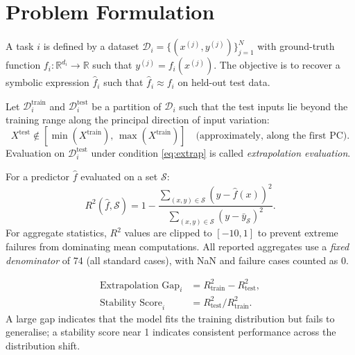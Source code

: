 \documentclass[twoside,11pt]{article}
\newcommand{\Rsq}{R^{2}}
\newcommand{\Rtrain}{R^{2}_{\mathrm{train}}}
\newcommand{\Rtest}{R^{2}_{\mathrm{test}}}
\begin{document}
\section{Problem Formulation}
\label{sec:problem}

\begin{definition}
A task $i$ is defined by a dataset $\mathcal{D}_i = \{(x^{(j)}, y^{(j)})\}_{j=1}^{N}$
with ground-truth function $f_i: \mathbb{R}^{d_i} \to \mathbb{R}$ such that
$y^{(j)} = f_i(x^{(j)})$.  The objective is to recover a symbolic expression
$\hat{f}_i$ such that $\hat{f}_i \approx f_i$ on held-out test data.
\end{definition}

\begin{definition}
Let $\mathcal{D}^{\mathrm{train}}_i$ and $\mathcal{D}^{\mathrm{test}}_i$ be a
partition of $\mathcal{D}_i$ such that the test inputs lie beyond the training range
along the principal direction of input variation:
\begin{equation}
  X^{\mathrm{test}} \notin [\min(X^{\mathrm{train}}),\, \max(X^{\mathrm{train}})]
  \quad \text{(approximately, along the first PC)}.
  \label{eq:extrap}
\end{equation}
Evaluation on $\mathcal{D}^{\mathrm{test}}_i$ under condition \eqref{eq:extrap}
is called \emph{extrapolation evaluation}.
\end{definition}

\begin{definition}
For a predictor $\hat{f}$ evaluated on a set $\mathcal{S}$:
\begin{equation}
  \Rsq(\hat{f}, \mathcal{S}) = 1 - \frac{\sum_{(x,y)\in\mathcal{S}}(y - \hat{f}(x))^2}
                                         {\sum_{(x,y)\in\mathcal{S}}(y - \bar{y}_{\mathcal{S}})^2}.
  \label{eq:r2}
\end{equation}
For aggregate statistics, $\Rsq$ values are clipped to $[-10, 1]$ to prevent
extreme failures from dominating mean computations.  All reported aggregates use a
\emph{fixed denominator} of 74 (all standard cases), with NaN and failure cases
counted as 0.
\end{definition}

\begin{definition}
\begin{align}
  \text{Extrapolation Gap}_i &= \Rtrain - \Rtest, \label{eq:gap}\\
  \text{Stability Score}_i   &= \Rtest / \Rtrain. \label{eq:stability}
\end{align}
A large gap indicates that the model fits the training distribution but fails
to generalise; a stability score near 1 indicates consistent performance across
the distribution shift.
\end{definition}
\end{document}
